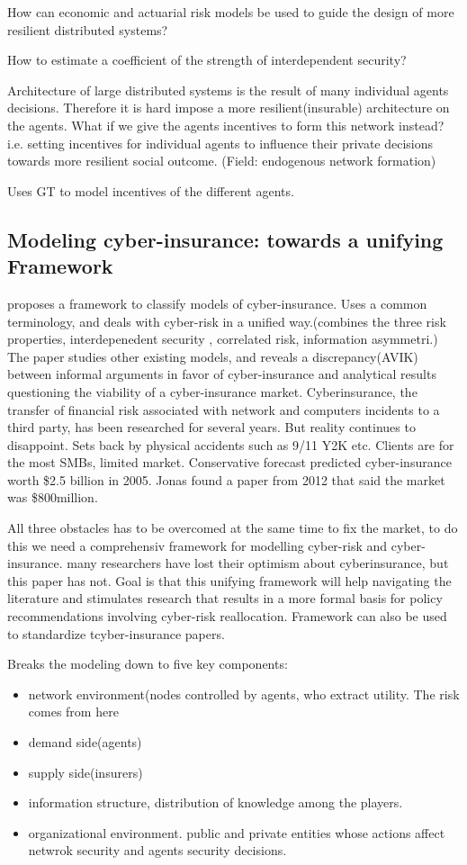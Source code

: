 How can economic and actuarial risk models be used to guide the design of more resilient distributed systems?

How to estimate a coefficient of the strength of interdependent security?

Architecture of large distributed systems is the result of many individual agents decisions. 
Therefore it is hard impose a more resilient(insurable) architecture on the agents. What if we give the agents incentives to form this network instead? i.e. setting incentives for individual agents to influence their private decisions towards more resilient social outcome. (Field: endogenous network formation)

Uses GT to model incentives of the different agents. 

\subsection{Modeling cyber-insurance: towards a unifying Framework}
\cite{bohme2010modeling}
proposes a framework to classify models of cyber-insurance. Uses a common terminology, 
and deals with cyber-risk in a unified way.(combines the three risk properties, interdepenedent security
, correlated risk, information asymmetri.)
The paper studies other existing models, and reveals a discrepancy(AVIK) between informal arguments in 
favor of cyber-insurance and analytical results questioning the viability of a cyber-insurance market.
Cyberinsurance, the transfer of financial risk associated with network and computers 
incidents to a third party, has been researched for several years. But reality continues to disappoint. 
Sets back by physical accidents such as 9/11 Y2K etc. Clients are for the most SMBs, limited market. 
Conservative forecast predicted cyber-insurance worth \$2.5 billion in 2005. Jonas found a paper from 2012 that said the market was \$800million.

All three obstacles has to be overcomed at the same time to fix the market,
 to do this we need a comprehensiv framework for modelling cyber-risk and cyber-insurance.
many researchers have lost their optimism about cyberinsurance, but this paper has not.
Goal is that this unifying framework will help navigating the literature and stimulates research that results in a more
formal basis for policy recommendations involving cyber-risk reallocation. Framework can also be used to standardize tcyber-insurance papers.

Breaks the modeling down to five key components: 
\begin{itemize}[topsep=-1em,parsep=0em,itemsep=0em] 
 \item network environment(nodes controlled by agents, who extract utility. 
 The risk comes from here \item demand side(agents) \item supply side(insurers) 
 \item information structure, distribution of knowledge among the players. 
 \item organizational environment. 
 public and private entities whose actions affect netwrok security and agents security decisions.
 
\end{itemize}

